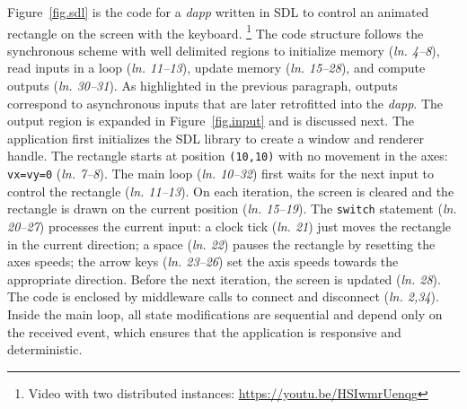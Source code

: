 \documentclass[sigplan,screen]{acmart}
\newcommand{\lin}[1]{(\emph{ln. #1}\xspace)}
\newcommand{\dapp}{\emph{dapp}\xspace}
\begin{document}
Figure~\ref{fig.sdl} is the code for a \dapp written in SDL to control an
animated rectangle on the screen with the keyboard.%
\footnote {
    Video with two distributed instances: \url{https://youtu.be/HSIwmrUenqg}
}
The code structure follows the synchronous scheme with well delimited regions
to initialize memory \lin{4--8}, read inputs in a loop \lin{11--13}, update
memory \lin{15--28}, and compute outputs \lin{30--31}.
As highlighted in the previous paragraph, outputs correspond to asynchronous
inputs that are later retrofitted into the \dapp.
The output region is expanded in Figure~\ref{fig.input} and is discussed next.
The application first initializes the SDL library to create a window and
renderer handle.
The rectangle starts at position \texttt{(10,10)} with no movement in the axes:
\texttt{vx=vy=0} \lin{7--8}.
The main loop \lin{10--32} first waits for the next input to control the
rectangle \lin{11--13}.
On each iteration, the screen is cleared and the rectangle is drawn on the
current position \lin{15--19}.
The \texttt{switch} statement \lin{20--27} processes the current input:
    a clock tick \lin{21} just moves the rectangle in the current direction;
    a space \lin{22} pauses the rectangle by resetting the axes speeds;
    the arrow keys \lin{23--26} set the axis speeds towards the appropriate direction.
Before the next iteration, the screen is updated \lin{28}.
The code is enclosed by middleware calls to connect and disconnect \lin{2,34}.
Inside the main loop, all state modifications are sequential and depend only on
the received event, which ensures that the application is responsive and
deterministic.
\end{document}
